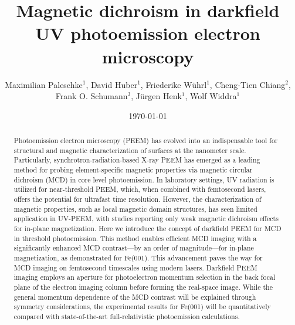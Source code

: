 \documentclass[prl,twocolumn,floatfix]{revtex4-2}
\begin{document}
\title{Magnetic dichroism in darkfield UV photoemission electron microscopy}
\author{Maximilian Paleschke$^{1}$, David Huber$^{1}$, Friederike Wührl$^1$, Cheng-Tien Chiang$^2$, Frank O. Schumann$^3$, Jürgen Henk$^1$, Wolf Widdra$^1$}





\date{\today}

\begin{abstract}
    Photoemission electron microscopy (PEEM) has evolved into an indispensable tool for structural and magnetic characterization of surfaces at the nanometer scale. Particularly, synchrotron-radiation-based X-ray PEEM has emerged as a leading method for probing element-specific magnetic properties via magnetic circular dichroism (MCD) in core level photoemission. In laboratory settings, UV radiation is utilized for near-threshold PEEM, which, when combined with femtosecond lasers, offers the potential for ultrafast time resolution. However, the characterization of magnetic properties, such as local magnetic domain structures, has seen limited application in UV-PEEM, with studies reporting only weak magnetic dichroism effects for in-plane magnetization. 
    Here we introduce the concept of darkfield PEEM for MCD in threshold photoemission. This method enables efficient MCD imaging with a significantly enhanced MCD contrast—by an order of magnitude—for in-plane magnetization, as demonstrated for Fe(001). This advancement paves the way for MCD imaging on femtosecond timescales using modern lasers. Darkfield PEEM imaging employs an aperture for photoelectron momentum selection in the back focal plane of the electron imaging column before forming the real-space image. While the general momentum dependence of the MCD contrast will be explained through symmetry considerations, the experimental results for Fe(001) will be quantitatively compared with state-of-the-art full-relativistic photoemission calculations.
\end{abstract}

\pacs{}

\maketitle
\end{document}
